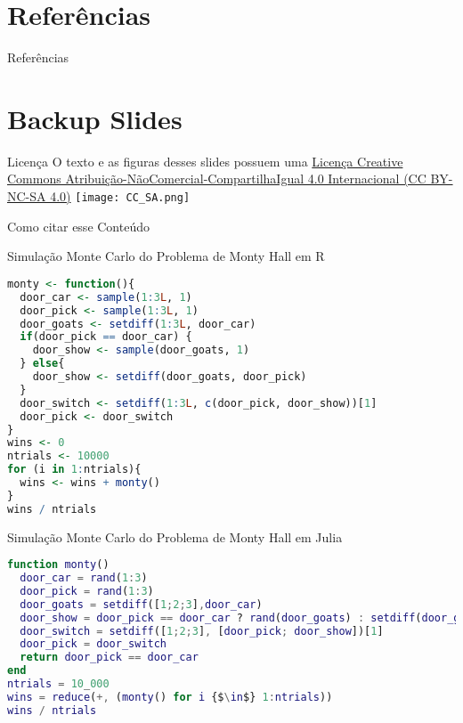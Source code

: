 \documentclass[aspectratio=169]{beamer}                    %
\begin{document}

\begingroup
    \AtBeginSection[]{}
    \section{Referências}
    \begin{frame}[allowframebreaks]{Referências}
        \printbibliography
    \end{frame}
\endgroup

\appendix %
\section*{Backup Slides}
\begin{frame}{Licença}
    \centering
    \vfill
    \Large O texto e as figuras desses slides possuem uma
    \href{https://creativecommons.org/licenses/by-nc-sa/4.0/deed.pt}{Licença
    Creative Commons
    Atribuição-NãoComercial-CompartilhaIgual 4.0 Internacional (CC BY-NC-SA 4.0)}
    \vfill
    \texttt{[image: CC\_SA.png]}
\end{frame}

\begin{frame}{Como citar esse Conteúdo}
  \centering
  \vfill
  \Large {}
  \vfill
\end{frame}

\begin{frame}[plain, noframenumbering, label=appendixmontyhall, fragile]{Simulação Monte Carlo do Problema de Monty Hall em R}
  \begin{lstlisting}[basicstyle=\footnotesize, language=R]
monty <- function(){
  door_car <- sample(1:3L, 1)
  door_pick <- sample(1:3L, 1)
  door_goats <- setdiff(1:3L, door_car)
  if(door_pick == door_car) {
    door_show <- sample(door_goats, 1)
  } else{
    door_show <- setdiff(door_goats, door_pick)
  }
  door_switch <- setdiff(1:3L, c(door_pick, door_show))[1]
  door_pick <- door_switch
}
wins <- 0
ntrials <- 10000
for (i in 1:ntrials){
  wins <- wins + monty()
}
wins / ntrials
    \end{lstlisting}
\end{frame}

\begin{frame}{Simulação Monte Carlo do Problema de Monty Hall em Julia}
  \begin{lstlisting}[basicstyle=\footnotesize, language=Matlab,escapeinside=\{\}]
function monty()
  door_car = rand(1:3)
  door_pick = rand(1:3)
  door_goats = setdiff([1;2;3],door_car)
  door_show = door_pick == door_car ? rand(door_goats) : setdiff(door_goats,door_pick)
  door_switch = setdiff([1;2;3], [door_pick; door_show])[1]
  door_pick = door_switch
  return door_pick == door_car
end
ntrials = 10_000
wins = reduce(+, (monty() for i {$\in$} 1:ntrials))
wins / ntrials
    \end{lstlisting}
\end{frame}
\end{document}
